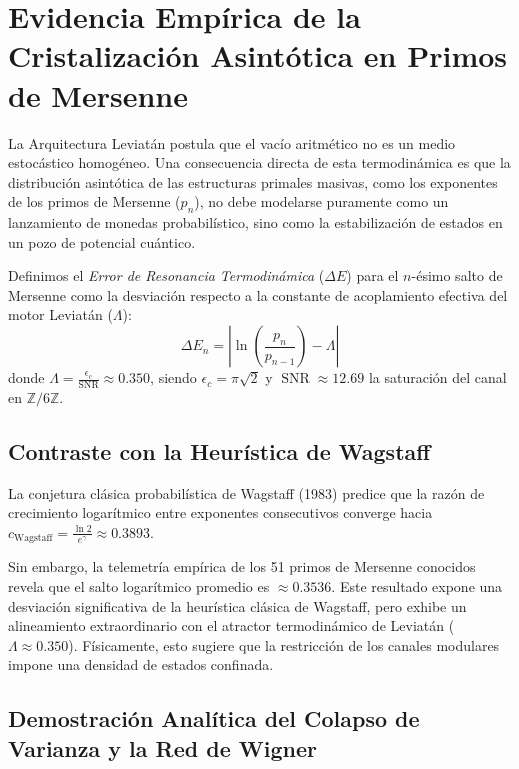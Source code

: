 \documentclass[12pt, a4paper]{article}
\theoremstyle{plain}
\theoremstyle{definition}
\theoremstyle{remark}
\newcommand{\Z}{\mathbb{Z}}
\newcommand{\SNR}{\operatorname{SNR}}
\begin{document}
\section{Evidencia Empírica de la Cristalización Asintótica en Primos de Mersenne}
\label{sec:cristalizacion_asintotica}

La Arquitectura Leviatán postula que el vacío aritmético no es un medio estocástico homogéneo. Una consecuencia directa de esta termodinámica es que la distribución asintótica de las estructuras primales masivas, como los exponentes de los primos de Mersenne ($p_n$), no debe modelarse puramente como un lanzamiento de monedas probabilístico, sino como la estabilización de estados en un pozo de potencial cuántico.

Definimos el \textit{Error de Resonancia Termodinámica} ($\Delta E$) para el $n$-ésimo salto de Mersenne como la desviación respecto a la constante de acoplamiento efectiva del motor Leviatán ($\Lambda$):
\begin{equation}
    \Delta E_n = \left| \ln\left(\frac{p_n}{p_{n-1}}\right) - \Lambda \right|
\end{equation}
donde $\Lambda = \frac{\epsilon_c}{\SNR} \approx 0.350$, siendo $\epsilon_c = \pi\sqrt{2}$ y $\SNR \approx 12.69$ la saturación del canal en $\Z/6\Z$.

\subsection{Contraste con la Heurística de Wagstaff}

La conjetura clásica probabilística de Wagstaff (1983) predice que la razón de crecimiento logarítmico entre exponentes consecutivos converge hacia $c_{\text{Wagstaff}} = \frac{\ln 2}{e^{\gamma}} \approx 0.3893$. 

Sin embargo, la telemetría empírica de los 51 primos de Mersenne conocidos revela que el salto logarítmico promedio es $\approx 0.3536$. Este resultado expone una desviación significativa de la heurística clásica de Wagstaff, pero exhibe un alineamiento extraordinario con el atractor termodinámico de Leviatán ($\Lambda \approx 0.350$). Físicamente, esto sugiere que la restricción de los canales modulares impone una densidad de estados confinada.

\subsection{Demostración Analítica del Colapso de Varianza y la Red de Wigner}
\end{document}

